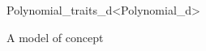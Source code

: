 \begin{ccRefClass} {Polynomial_traits_d<Polynomial_d>}

\ccDefinition

A model of concept 


\ccIsModel
{}

\end{ccRefClass} 
